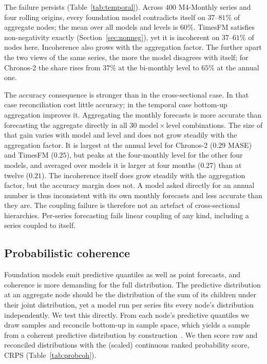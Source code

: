 \documentclass[review,number]{elsarticle}
\begin{document}
The failure persists (Table~\ref{tab:temporal}). Across $400$ M4-Monthly series and
four rolling origins, every foundation model contradicts itself on $37$--$81\%$ of
aggregate nodes; the mean over all models and levels is $60\%$. TimesFM satisfies non-negativity exactly (Section~\ref{sec:nonneg}), yet it is
incoherent on $37$--$61\%$ of nodes here. Incoherence also grows with the aggregation
factor. The further apart the two views of the same series, the more the model disagrees
with itself; for Chronos-2 the share rises from $37\%$ at the bi-monthly level to
$65\%$ at the annual one.

The accuracy consequence is stronger than in the cross-sectional case. In that case
reconciliation cost little accuracy; in the temporal case bottom-up aggregation improves
it. Aggregating
the monthly forecasts is more accurate than forecasting the aggregate directly in all $30$
model\,$\times$\,level combinations. The size of that gain varies with model and level
and does not grow steadily with the aggregation factor. It is largest at the annual
level for Chronos-2 ($0.29$ MASE) and TimesFM ($0.25$), but peaks at the four-monthly
level for the other four models, and averaged over models it is larger at four months
($0.27$) than at twelve ($0.21$). The incoherence itself does grow steadily with the aggregation factor, but
the accuracy margin does not. A model asked directly for an annual number is thus
inconsistent with its own monthly forecasts and less accurate than they are. The
coupling failure is therefore not an artefact of cross-sectional hierarchies. Per-series
forecasting fails linear coupling of any kind, including a series coupled to itself.



\subsection{Probabilistic coherence}
\label{sec:probcoh}
Foundation models emit predictive quantiles as well as point forecasts, and
coherence is more demanding for the full distribution. The predictive distribution at an
aggregate node
should be the distribution of the sum of its children under their joint distribution,
yet a model run per series fits every node's
distribution independently. We test this directly. From each node's predictive
quantiles we draw samples and reconcile bottom-up in sample space, which yields a
sample from a coherent predictive distribution by
construction~\citep{probrecon2023}. We then score raw and
reconciled distributions with the (scaled) continuous ranked probability score, CRPS
(Table~\ref{tab:probcoh}).
\end{document}
